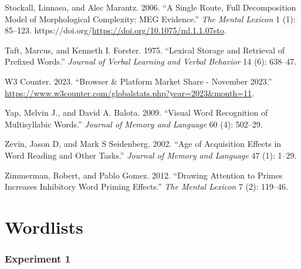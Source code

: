 \documentclass[
]{interact}
\newlength{\cslhangindent}
\newenvironment{CSLReferences}[2] %
 {\begin{list}{}{%
  \setlength{\itemindent}{0pt}
  \setlength{\leftmargin}{0pt}
  \setlength{\parsep}{0pt}
  \ifodd #1
   \setlength{\leftmargin}{\cslhangindent}
   \setlength{\itemindent}{-1\cslhangindent}
  \fi
  \setlength{\itemsep}{#2\baselineskip}}}
 {\end{list}}
\begin{document}
\begin{CSLReferences}{1}{0}
Stockall, Linnaea, and Alec Marantz. 2006. {``A Single Route, Full
Decomposition Model of Morphological Complexity: MEG Evidence.''}
\emph{The Mental Lexicon} 1 (1): 85--123.
https://doi.org/\url{https://doi.org/10.1075/ml.1.1.07sto}.

Taft, Marcus, and Kenneth I. Forster. 1975. {``Lexical Storage and
Retrieval of Prefixed Words.''} \emph{Journal of Verbal Learning and
Verbal Behavior} 14 (6): 638--47.

W3 Counter. 2023. {``Browser \& Platform Market Share - November
2023.''}
\url{https://www.w3counter.com/globalstats.php?year=2023&month=11}.

Yap, Melvin J., and David A. Balota. 2009. {``Visual Word Recognition of
Multisyllabic Words.''} \emph{Journal of Memory and Language} 60 (4):
502--29.

Zevin, Jason D, and Mark S Seidenberg. 2002. {``Age of Acquisition
Effects in Word Reading and Other Tasks.''} \emph{Journal of Memory and
Language} 47 (1): 1--29.

Zimmerman, Robert, and Pablo Gomez. 2012. {``Drawing Attention to Primes
Increases Inhibitory Word Priming Effects.''} \emph{The Mental Lexicon}
7 (2): 119--46.

\end{CSLReferences}

\newpage

\section*{Wordlists}\label{wordlists}

\subsubsection*{Experiment 1}\label{experiment-1}
\end{document}
